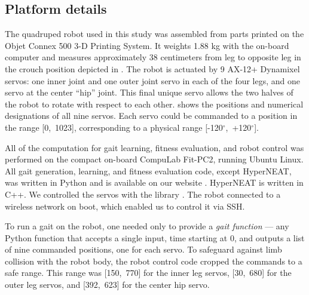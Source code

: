 \subsection{Platform details}






The quadruped robot used in this study was assembled from parts
printed on the Objet Connex 500 3-D Printing System. It weights 1.88
kg with the on-board computer and measures approximately 38
centimeters from leg to opposite leg in the crouch position depicted
in . The robot is actuated by 9 AX-12+
Dynamixel servos: one inner joint and one outer joint servo in each of
the four legs, and one servo at the center ``hip'' joint.  This final
unique servo allows the two halves of the robot to rotate with respect
to each other.  shows the positions and numerical
designations of all nine servos.  Each servo could be commanded to a
position in the range [0,~1023], corresponding to a physical range
[-120$^{\circ}$,~+120$^{\circ}$].

All of the computation for gait learning, fitness evaluation, and
robot control was performed on the compact on-board CompuLab Fit-PC2,
running Ubuntu Linux.  All gait generation, learning, and fitness
evaluation code, except HyperNEAT, was written in Python and is
available on our website \cite{quadratotWeb}.  HyperNEAT is written in
C++.  We controlled the servos with the  library
\cite{pydynamixel}.  The robot connected to a wireless network on
boot, which enabled us to control it via SSH.


To run a gait on the robot, one needed only to provide a \emph{gait
  function} --- any Python function that accepts a single input, time
starting at 0, and outputs a list of nine commanded positions, one for
each servo.  To safeguard against limb collision with the robot body,
the robot control code cropped the commands to a safe range.  This
range was [150,~770] for the inner leg servos, [30,~680] for the outer
leg servos, and [392,~623] for the center hip servo.






